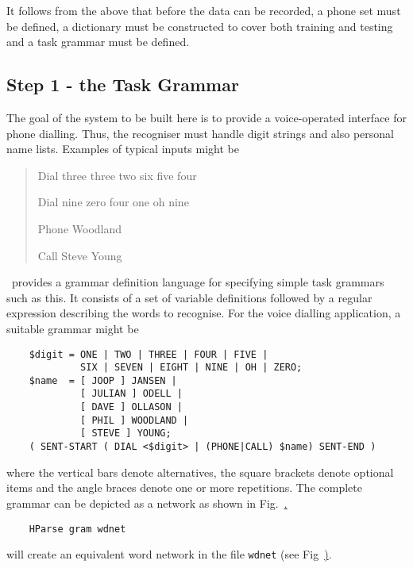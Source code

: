 It follows from the above that before the data can be recorded, a phone set
must be defined, a dictionary must be constructed to cover both training and
testing and a task grammar must be defined.

\subsection{Step 1 - the Task Grammar}

The goal of the system to be built here is to provide a voice-operated
interface for phone dialling. Thus, the recogniser must handle digit strings
and also personal name lists. Examples of typical inputs might be
\begin{quote}
Dial three three two six five four

Dial nine zero four one oh nine

Phone Woodland

Call Steve Young
\end{quote}

\HTK\ provides a grammar definition language for
specifying simple task grammars such as this.  It consists
of a set of variable definitions followed by a regular 
expression describing the words to recognise.  For the
voice dialling application, a suitable grammar might be
\begin{verbatim}
    $digit = ONE | TWO | THREE | FOUR | FIVE |
             SIX | SEVEN | EIGHT | NINE | OH | ZERO;
    $name  = [ JOOP ] JANSEN |
             [ JULIAN ] ODELL |
             [ DAVE ] OLLASON |
             [ PHIL ] WOODLAND | 
             [ STEVE ] YOUNG;
    ( SENT-START ( DIAL <$digit> | (PHONE|CALL) $name) SENT-END )
\end{verbatim}
where the vertical bars denote alternatives, the square brackets denote
optional items and the angle braces denote one or more repetitions.  The
complete grammar can be depicted as a network as shown in
Fig.~\href{f:dialnet}.


\begin{verbatim}
    HParse gram wdnet
\end{verbatim}
will create an equivalent word network in 
the file \texttt{wdnet} (see Fig~\href{f:step1}).


